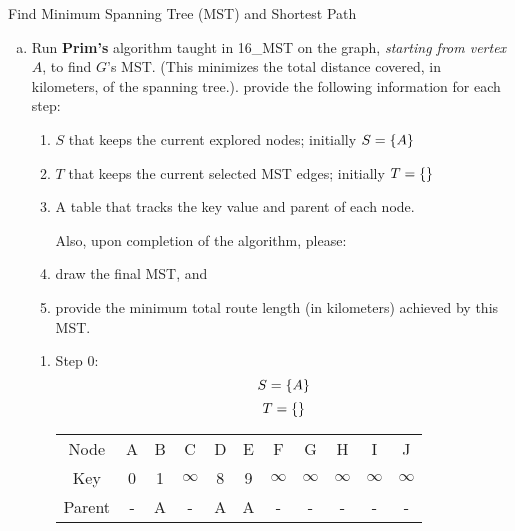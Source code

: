 \documentclass{article}
\numberwithin{table}{section}
\numberwithin{figure}{section}
\begin{document}
\begin{section}{Find Minimum Spanning Tree (MST) and Shortest Path}
\begin{enumerate}[(A)]
    \begin{enumerate}[(a)]
        \item Run \textbf{Prim’s} algorithm taught in 16\_MST on the graph, \textit{starting from vertex $A$}, to find $G$’s MST. (This minimizes the total distance covered, in kilometers, of the spanning tree.). provide the following information for each step:
        \begin{enumerate}[(1)]
            \item $S$ that keeps the current explored nodes; initially $S = \left\{A\right\}$
            \item $T$ that keeps the current selected MST edges; initially $T = \left\{\right\}$
            \item A table that tracks the key value and parent of each node.
            
            Also, upon completion of the algorithm, please:
            \item draw the final MST, and
            \item provide the minimum total route length (in kilometers) achieved by this MST.
        \end{enumerate}
        
        \begin{tcolorbox}[breakable]
        \begin{enumerate}[(1)]

            \item Step 0:
            $$S = \left\{A\right\}$$
            $$T = \left\{\right\}$$
            \begin{table}[H]
                \centering
                \begin{tabular}{c|cccccccccc}
                    \hline
                    Node & A & B & C & D & E & F & G & H & I & J \\
                    Key & 0 & 1 & $\infty$ & 8 & 9 & $\infty$ & $\infty$ & $\infty$ & $\infty$ & $\infty$ \\
                    Parent & - & A & - & A & A & - & - & - & - & - \\
                    \hline
                \end{tabular}
            \end{table}
        


\end{enumerate}
\end{tcolorbox}
\end{enumerate}
\end{enumerate}
\end{section}
\end{document}
